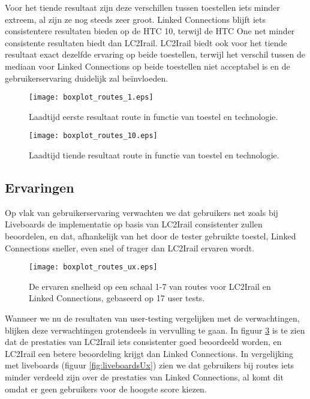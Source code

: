 Voor het tiende resultaat zijn deze verschillen tussen toestellen iets minder extreem, al zijn ze nog steeds zeer groot. Linked Connections blijft iets consistentere resultaten bieden op de HTC 10, terwijl de HTC One net minder consistente resultaten biedt dan LC2Irail. LC2Irail biedt ook voor het tiende resultaat exact dezelfde ervaring op beide toestellen, terwijl het verschil tussen de mediaan voor Linked Connections op beide toestellen niet acceptabel is en de gebruikerservaring duidelijk zal beïnvloeden.

\begin{figure}[h]
	\centering
	\texttt{[image: boxplot\_routes\_1.eps]}
	\caption[Laadtijd eerste resultaat route in functie van toestel en technologie]{Laadtijd eerste resultaat route in functie van toestel en technologie.}
	\label{fig:routesBoxplot1}
\end{figure}

\begin{figure}[h]
	\centering
	\texttt{[image: boxplot\_routes\_10.eps]}
	\caption[Laadtijd tiende resultaat route in functie van toestel en technologie]{Laadtijd tiende resultaat route in functie van toestel en technologie.}
	\label{fig:routesBoxplot10}
\end{figure}

\subsection{Ervaringen}

Op vlak van gebruikerservaring verwachten we dat gebruikers net zoals bij Liveboards de implementatie op basis van LC2Irail consistenter zullen beoordelen, en dat, afhankelijk van het door de tester gebruikte toestel, Linked Connections sneller, even snel of trager dan LC2Irail ervaren wordt.

\begin{figure}[h]
	\centering
	\texttt{[image: boxplot\_routes\_ux.eps]}
	\caption[Ervaren snelheid van routes]{De ervaren snelheid op een schaal 1-7 van routes voor LC2Irail en Linked Connections, gebaseerd op 17 user tests.}
	\label{fig:routesUx}
\end{figure}

Wanneer we nu de resultaten van user-testing vergelijken met de verwachtingen, blijken deze verwachtingen grotendeels in vervulling te gaan. In figuur \ref{fig:routesUx} is te zien dat de prestaties van LC2Irail iets consistenter goed beoordeeld worden, en LC2Irail een betere beoordeling krijgt dan Linked Connections. In vergelijking met liveboards (figuur \ref{fig:liveboardsUx}) zien we dat gebruikers bij routes iets minder verdeeld zijn over de prestaties van Linked Connections, al komt dit omdat er geen gebruikers voor de hoogste score kiezen. 

